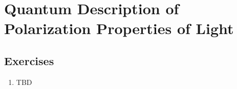 \chapter{Quantum Description of Polarization Properties of Light}
\label{chPolarization}




\section{Exercises}
\begin{enumerate}
\item TBD
\end{enumerate}